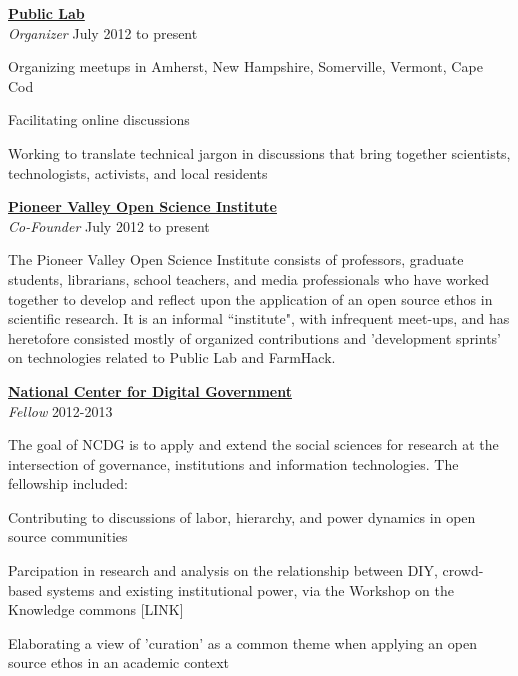 \documentclass[10pt]{article}
\newcommand{\blankline}{\quad\pagebreak[3]}
\newcommand{\halfblankline}{\quad\vspace{-0.5\baselineskip}\pagebreak[3]}
\begin{document}
\blankline

\href{http://publiclab.org}{\textbf{Public Lab}}  \\
\emph{Organizer} \hfill {July 2012 to present}

\halfblankline
\begin{innerlist}
\item Organizing meetups in Amherst, New Hampshire, Somerville, Vermont, Cape Cod
\item Facilitating online discussions
\item Working to translate technical jargon in discussions that bring together scientists, technologists, activists, and local residents
\end{innerlist}
   
\blankline

\href{http://pvos.org}{\textbf{Pioneer Valley Open Science Institute}}  \\
\emph{Co-Founder} \hfill {July 2012 to present}

\halfblankline

The Pioneer Valley Open Science Institute consists of professors, graduate students, librarians, school teachers, and media professionals who have worked together to develop and reflect upon the application of an open source ethos in scientific research.  It is an informal ``institute", with infrequent meet-ups, and has heretofore consisted mostly of organized contributions and 'development sprints' on technologies related to Public Lab and FarmHack.  

\blankline

\href{http://www.umass.edu/digitalcenter/}{\textbf{National Center for Digital Government}}\\
\emph{Fellow} \hfill {2012-2013}

\halfblankline

The goal of NCDG is to apply and extend the social sciences for research at the intersection of governance, institutions and information technologies. The fellowship included:

\begin{innerlist}
\item Contributing to discussions of labor, hierarchy, and power dynamics in open source communities
\item Parcipation in research and analysis on the relationship between DIY, crowd-based systems and existing institutional power, via the Workshop on the Knowledge commons [LINK]
\item Elaborating a view of 'curation' as a common theme when applying an open source ethos in an academic context
\end{innerlist}
   
\end{document}
